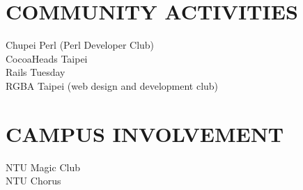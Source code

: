 \documentclass{res}
\begin{document}
\begin{resume}
\section{COMMUNITY ACTIVITIES}
Chupei Perl (Perl Developer Club)\\
CocoaHeads Taipei\\
Rails Tuesday\\
RGBA Taipei (web design and development club)\\

\section{CAMPUS INVOLVEMENT}
NTU Magic Club\\
NTU Chorus\\

 
\end{resume}
\end{document}
